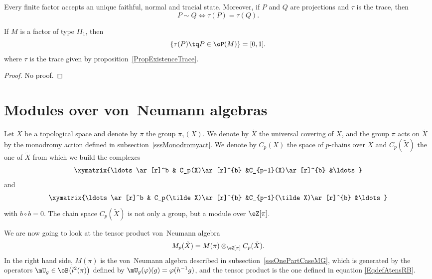 \begin{proposition}		\label{PropExistenceTrace}
Every finite factor accepts an unique faithful, normal and tracial state. Moreover, if $P$ and $Q$ are projections and $\tau$ is the trace, then
\begin{equation}
	P\sim Q\Leftrightarrow \tau(P)=\tau(Q).
\end{equation}
\end{proposition}

\begin{proposition}	\label{PropFactIIunttedim}						
If $M$ is a factor of type $II_1$, then
\begin{equation}
	\{ \tau(P)\tq P\in \oP(M) \}=[0,1].
\end{equation}
where $\tau$ is the trace given by proposition~\ref{PropExistenceTrace}.
\end{proposition}

\begin{proof}
No proof.
\end{proof}
					\section{Modules over von~Neumann algebras}
\label{SecOverModVNalgDim}

Let $X$ be a topological space and denote by $\pi$ the group $\pi_1(X)$. We denote by $\tilde X$ the universal covering of $X$, and the group $\pi$ acts on $\tilde X$ by the monodromy action defined in subsection~\ref{sssMonodromyact}. We denote by $C_p(X)$ the space of $p$-chains over $X$ and $C_p(\tilde X)$ the one of $\tilde X$ from which we build the complexes
\[
  \xymatrix{%
   \ldots \ar[r]^b	&	C_p(X)\ar[r]^{b}	&C_{p-1}(X)\ar[r]^{b}	&\ldots
}
\]
and
\[
  \xymatrix{%
   \ldots \ar[r]^b	&	C_p(\tilde X)\ar[r]^{b}	&C_{p-1}(\tilde X)\ar[r]^{b}	&\ldots
}
\]
with $b\circ b=0$. The chain space $C_p(\tilde X)$ is not only a group, but a module over $\eZ[\pi]$.

We are now going to look at the tensor product von~Neumann algebra
\begin{equation}
	M_p(\tilde X)=M(\pi)\otimes_{\eZ[\pi]}C_p(\tilde X).
\end{equation}
In the right hand side, $M(\pi)$ is the von~Neumann algebra described in subsection~\ref{sssOnePartCaseMG}, which is generated by the operators $\mU_g\in\oB\big( l^2(\pi) \big)$ defined by $\mU_g(\varphi)(g)=\varphi(h^{-1}g)$, and the tensor product is the one defined in equation \eqref{EqdefAtensRB}.

